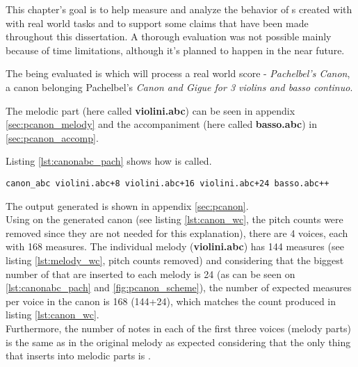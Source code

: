 This chapter's goal is to help measure and analyze the behavior of \abcpt{}s created with \abcdt{}
with real world tasks and to support some claims that have been made throughout this dissertation. A
thorough evaluation was not possible mainly because of time limitations, although it's planned to
happen in the near future.

The \abcpt{} being evaluated is \canonabc{} which will process a real world \abc{} score -
\emph{Pachelbel's Canon}, a canon belonging Pachelbel's \emph{Canon and Gigue for 3 violins and
basso continuo}.

The melodic part (here called \textbf{violini.abc}) can be seen in appendix \ref{sec:pcanon_melody}
and the accompaniment (here called \textbf{basso.abc}) in \ref{sec:pcanon_accomp}.

Listing \ref{lst:canonabc_pach} shows how \canonabc{} is called.\\

\begin{lstlisting}[caption={\canonabc{} for Pachelbel's Canon},label={lst:canonabc_pach},captionpos=t,abovecaptionskip=-\medskipamount]
canon_abc violini.abc+8 violini.abc+16 violini.abc+24 basso.abc++
\end{lstlisting}

The output generated is shown in appendix \ref{sec:pcanon}.\\

Using \wcabc{} on the generated canon (see listing \ref{lst:canon_wc}, the pitch counts were removed
since they are not needed for this explanation), there are 4 voices, each with 168 measures. The
individual melody (\textbf{violini.abc}) has 144 measures (see listing \ref{lst:melody_wc}, pitch
counts removed) and considering that the biggest number of \measurerests{} that are inserted to each
melody is 24 (as can be seen on \ref{lst:canonabc_pach} and \ref{fig:pcanon_scheme}), the number of
expected measures per voice in the canon is 168 (144+24), which matches the count produced in
listing \ref{lst:canon_wc}.\\





Furthermore, the number of notes in each of the first three voices (melody parts) is the same as in
the original melody as expected considering that the only thing that \canonabc{} inserts into
melodic parts is \measurerests{}.

